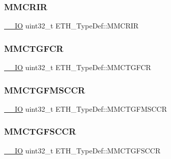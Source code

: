 \mbox{\label{struct_e_t_h___type_def_a336820119836db549e754619be7f6aa5}} 
\subsubsection{\texorpdfstring{MMCRIR}{MMCRIR}}
{\footnotesize\ttfamily \mbox{\hyperlink{group___c_m_s_i_s___c_m3__core__definitions_gaec43007d9998a0a0e01faede4133d6be}{\+\_\+\+\_\+\+IO}} uint32\+\_\+t E\+T\+H\+\_\+\+Type\+Def\+::\+M\+M\+C\+R\+IR}

\mbox{\label{struct_e_t_h___type_def_a0e2a79b3b31db0f07e269db092a74f1e}} 
\subsubsection{\texorpdfstring{MMCTGFCR}{MMCTGFCR}}
{\footnotesize\ttfamily \mbox{\hyperlink{group___c_m_s_i_s___c_m3__core__definitions_gaec43007d9998a0a0e01faede4133d6be}{\+\_\+\+\_\+\+IO}} uint32\+\_\+t E\+T\+H\+\_\+\+Type\+Def\+::\+M\+M\+C\+T\+G\+F\+CR}

\mbox{\label{struct_e_t_h___type_def_acec318669d03f140af4a760093411150}} 
\subsubsection{\texorpdfstring{MMCTGFMSCCR}{MMCTGFMSCCR}}
{\footnotesize\ttfamily \mbox{\hyperlink{group___c_m_s_i_s___c_m3__core__definitions_gaec43007d9998a0a0e01faede4133d6be}{\+\_\+\+\_\+\+IO}} uint32\+\_\+t E\+T\+H\+\_\+\+Type\+Def\+::\+M\+M\+C\+T\+G\+F\+M\+S\+C\+CR}

\mbox{\label{struct_e_t_h___type_def_a1b55806b0e28cc18316cb1b9350aab2c}} 
\subsubsection{\texorpdfstring{MMCTGFSCCR}{MMCTGFSCCR}}
{\footnotesize\ttfamily \mbox{\hyperlink{group___c_m_s_i_s___c_m3__core__definitions_gaec43007d9998a0a0e01faede4133d6be}{\+\_\+\+\_\+\+IO}} uint32\+\_\+t E\+T\+H\+\_\+\+Type\+Def\+::\+M\+M\+C\+T\+G\+F\+S\+C\+CR}

